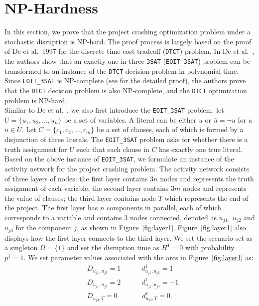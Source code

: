 \documentclass[11pt]{article}
\begin{document}
		
	\section{NP-Hardness} \label{sec:nphard}
		In this section, we prove that the project crashing optimization problem under a stochastic disruption is NP-hard. The proof process is largely based on the proof of De et al.~1997 for the discrete time-cost tradeoff (\verb|DTCT|) problem. In De et al.~\cite{de1997complexity}, the authors show that an exactly-one-in-three \verb|3SAT| (\verb|EOIT_3SAT|) problem can be transformed to an instance of the \verb|DTCT| decision problem in polynomial time. Since \verb|EOIT_3SAT| is NP-complete (see \cite{Garey1979ComputersAI} for the detailed proof), the authors prove that the \verb|DTCT| decision problem is also NP-complete, and the \verb|DTCT| optimization problem is NP-hard.\\
		\newline
		Similar to De et al.~\cite{de1997complexity}, we also first introduce the \verb|EOIT_3SAT| problem: let \(U = \{u_1,u_2, \dots, u_n\}\) be a set of variables. A literal can be either \(u\) or \(\bar{u} = \neg u\) for a \(u \in U\). Let \(C = \{c_1, c_2, \dots, c_m\}\) be a set of clauses, each of which is formed by a disjunction of three literals. The \verb|EOIT_3SAT| problem asks for whether there is a truth assignment for \(U\) such that each clause in \(C\) has exactly one true literal. \\
		\newline
		Based on the above instance of \verb|EOIT_3SAT|, we formulate an instance of the activity network for the project crashing problem. The activity network consists of three layers of nodes: the first layer contains \(3n\) nodes and represents the truth assignment of each variable; the second layer contains \(3m\) nodes and represents the value of clauses; the third layer contains node \(T\) which represents the end of the project. The first layer has \(n\) components in parallel, each of which corresponds to a variable and contains 3 nodes connected, denoted as \(u_{j1},\ u_{j2}\) and \(u_{j3}\) for the component \(j\), as shown in Figure~\ref{fig:layer1}. Figure~\ref{fig:layer1} also displays how the first layer connects to the third layer. We set the scenario set as a singleton \(\Omega = \{1\}\) and set the disruption time as \(H^1 = 0\) with probability \(p^1 = 1\). We set parameter values associated with the arcs in Figure~\ref{fig:layer1} as:
		\begin{align*}
		& D_{u_{j1},u_{j2}} = 1 \qquad \quad d^1_{u_{j1},u_{j2}} = 1\\
		& D_{u_{j1},u_{j3}} = 2 \qquad \quad d^1_{u_{j1},u_{j3}} = -1  \\
		& D_{u_{j3},T} = 0 \qquad \quad \;\; d^1_{u_{j3},T} = 0.
		\end{align*}
\end{document}
